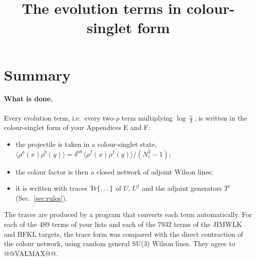 \documentclass[10pt]{article}
\title{The evolution terms in colour-singlet form}
\date{}
\numberwithin{equation}{section}
\begin{document}
\maketitle
\tableofcontents

\section{Summary}\label{sec:summary}
\paragraph{What is done.} Every evolution term, i.e.\ every two-$\rho$ term multiplying $\log\frac{\vee}{\Lambda}$, is written in the colour-singlet form of your Appendices E and F:
\begin{itemize}
\item the projectile is taken in a colour-singlet state, $\langle\rho^a(x)\rho^b(y)\rangle=\delta^{ab}\,\langle\rho^f(x)\rho^f(y)\rangle/(N_c^2-1)$;
\item the colour factor is then a closed network of adjoint Wilson lines;
\item it is written with traces ${\rm Tr}\{\dots\}$ of $U$, $U^\dagger$ and the adjoint generators $T^e$ (Sec.~\ref{sec:rules}).
\end{itemize}
The traces are produced by a program that converts each term automatically. For each of the 489 terms of your lists and each of the 7932 terms of the JIMWLK and BFKL targets, the trace form was compared with the direct contraction of the colour network, using random general SU(3) Wilson lines. They agree to @@VALMAX@@.
\end{document}
